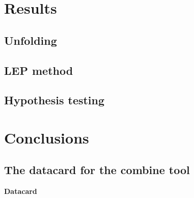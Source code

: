 \documentclass[titlepage, a4paper, EN]{mythesis}
\renewcommand{\normalsize}{\fontsize{12pt}{13.4pt}\selectfont}
\begin{document}
\chapter{Results}
\label{chap:results}


\clearpage
\section{Unfolding}


\clearpage
\section{LEP method}


\clearpage
\section{Hypothesis testing}


\chapter{Conclusions}


\appendix
{
      \begin{landscape}
        \chapter{The datacard for the combine tool}
        \label{a:datacard}
        \textbf{Datacard}\\
        \footnotesize
        
        \normalsize
      \end{landscape}
      
}
\clearpage
\printbibliography[heading=bibintoc]
\end{document}
